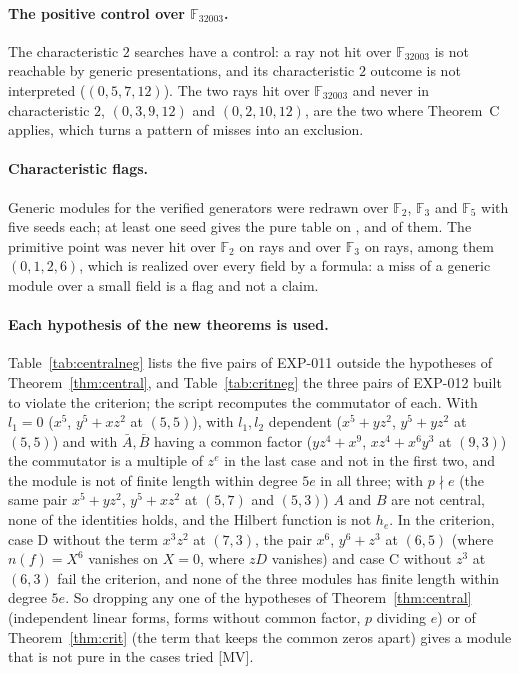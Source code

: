 \documentclass[11pt]{article}
\theoremstyle{definition}
\theoremstyle{remark}
\newcommand{\EXP}[1]{\mbox{EXP-#1}}
\newcommand{\F}{\mathbb{F}}
\begin{document}
\paragraph{The positive control over $\F_{32003}$.} The characteristic $2$ searches have a control: a ray not hit over $\F_{32003}$ is not reachable by generic presentations, and its characteristic $2$ outcome is not interpreted ($(0,5,7,12)$). The two rays hit over $\F_{32003}$ and never in characteristic $2$, $(0,3,9,12)$ and $(0,2,10,12)$, are the two where Theorem~C applies, which turns a pattern of misses into an exclusion.

\paragraph{Characteristic flags.} Generic modules for the \nflagGen{} verified generators were redrawn over $\F_2$, $\F_3$ and $\F_5$ with five seeds each; at least one seed gives the pure table on \nflagTwo{}, \nflagThree{} and \nflagFive{} of them. The primitive point was never hit over $\F_2$ on \nflagRaysTwo{} rays and over $\F_3$ on \nflagRaysThree{} rays, among them $(0,1,2,6)$, which is realized over every field by a formula: a miss of a generic module over a small field is a flag and not a claim.

\paragraph{Each hypothesis of the new theorems is used.} Table~\ref{tab:centralneg} lists the five pairs of \EXP{011} outside the hypotheses of Theorem~\ref{thm:central}, and Table~\ref{tab:critneg} the three pairs of \EXP{012} built to violate the criterion; the script recomputes the commutator of each. With $l_1=0$ ($x^5$, $y^5+xz^2$ at $(5,5)$), with $l_1,l_2$ dependent ($x^5+yz^2$, $y^5+yz^2$ at $(5,5)$) and with $\bar A,\bar B$ having a common factor ($yz^4+x^9$, $xz^4+x^6y^3$ at $(9,3)$) the commutator is a multiple of $z^e$ in the last case and not in the first two, and the module is not of finite length within degree $5e$ in all three; with $p\nmid e$ (the same pair $x^5+yz^2$, $y^5+xz^2$ at $(5,7)$ and $(5,3)$) $A$ and $B$ are not central, none of the identities holds, and the Hilbert function is not $h_e$. In the criterion, case D without the term $x^3z^2$ at $(7,3)$, the pair $x^6$, $y^6+z^3$ at $(6,5)$ (where $n(f)=X^6$ vanishes on $X=0$, where $zD$ vanishes) and case C without $z^3$ at $(6,3)$ fail the criterion, and none of the three modules has finite length within degree $5e$. So dropping any one of the hypotheses of Theorem~\ref{thm:central} (independent linear forms, forms without common factor, $p$ dividing $e$) or of Theorem~\ref{thm:crit} (the term that keeps the common zeros apart) gives a module that is not pure in the cases tried [MV].
\end{document}
